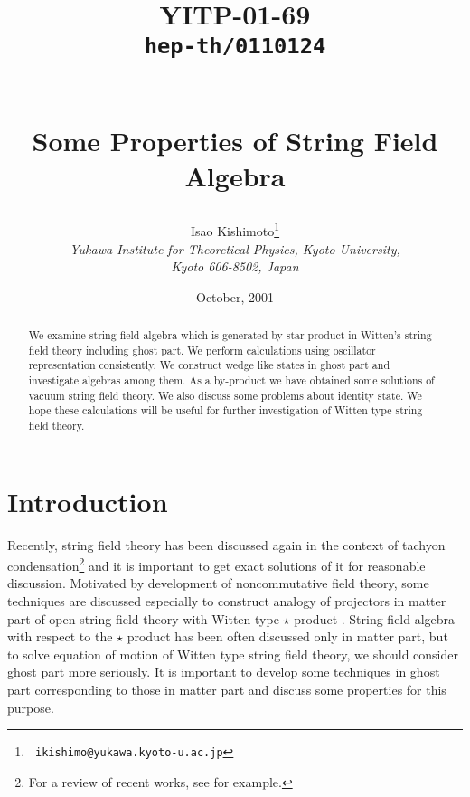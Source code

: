 \documentclass[12pt,a4paper]{article}
\begin{document}
\begin{titlepage}
\title{
\hfill\parbox{4cm}
{\normalsize YITP-01-69\\{\tt hep-th/0110124}}\\
\vspace{1cm}
Some Properties of String Field Algebra}
\author{
Isao {\sc Kishimoto}\thanks{{\tt
    ikishimo@yukawa.kyoto-u.ac.jp}}
\\[7pt]
{\it Yukawa Institute for Theoretical Physics, Kyoto University,}\\
{\it  Kyoto 606-8502, Japan}
}
\date{\normalsize October, 2001}
\maketitle
\thispagestyle{empty}

\begin{abstract}
\normalsize
We examine string field algebra which is generated by star product in Witten's string field theory including ghost part. We perform calculations using oscillator representation consistently. We construct wedge like states in ghost part and investigate algebras among them.  As a by-product we have obtained some solutions of vacuum string field theory. We also discuss some problems about identity state. We hope these calculations will be useful for further investigation of Witten type string field theory.
\end{abstract}

 
\end{titlepage}



\section{Introduction}

Recently, string field theory has been discussed again in the context of tachyon condensation\footnote{
	For a review of recent works, see \cite{KO} for example.
} and it is important to get exact solutions of it for reasonable discussion. 
Motivated by development of noncommutative field theory, some techniques are discussed especially to construct analogy of projectors in matter part of open string field theory with Witten type $\star$ product \cite{Witten}.
String field algebra with respect to the $\star$ product has been often discussed only in matter part, but to solve equation of motion of Witten type string field theory, we should consider ghost part more seriously. It is important to develop some techniques in ghost part corresponding to those in matter part and discuss some properties for this purpose.
\end{document}
